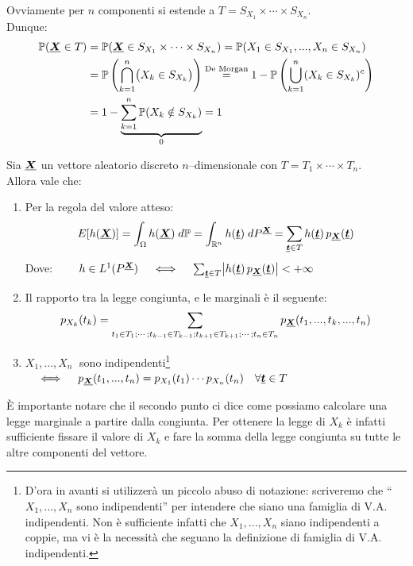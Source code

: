 \begin{teorema}
\begin{dimostrazione}
    Ovviamente per $n$ componenti si estende a $T=S_{X_1}\times \cdots \times S_{X_n}$.\\
    Dunque: 
    \begin{align*}
        \mathbb{P}(\underline{{\boldsymbol{X}}}\in T) & = \mathbb{P}(\underline{{\boldsymbol{X}}} \in S_{X_1}\times \cdots \times S_{X_n}) = \mathbb{P}(X_1\in S_{X_1}, ..., X_n\in S_{X_n}) \\
        & = \mathbb{P}\left( \bigcap_{k=1}^n \bigl(X_k \in S_{X_k}\bigr)\right) \overset{\text{De Morgan}}{ = }1- \mathbb{P}\left(\bigcup_{k=1}^n (X_k\in S_{X_k})^c\right)\\
        & = 1- \underbrace{\sum_{k=1}^n\mathbb{P}(X_k\notin S_{X_k})}_{0} = 1
    \end{align*}
    \end{dimostrazione}
\end{teorema}

\begin{proposizione}
    Sia $\underline{{\boldsymbol{X}}}$ un vettore aleatorio discreto $n$--dimensionale con $T = T_1\times\cdots\times T_n$.\\
    Allora vale che:
    \begin{enumerate}
        \item Per la regola del valore atteso:
        \[E[h(\underline{{\boldsymbol{X}}})] = \int_\Omega h(\underline{{\boldsymbol{X}}})\;d\mathbb{P} = \int_{\mathbb{R}^n}h(\underline{{\boldsymbol{t}}})\;dP^{\underline{{\boldsymbol{X}}}} = \sum_{\underline{{\boldsymbol{t}}}\in T} h(\underline{{\boldsymbol{t}}})\,p_{\underline{{\boldsymbol{X}}}}(\underline{{\boldsymbol{t}}})\]
        Dove: \(\qquad h\in L^1(P^{\underline{{\boldsymbol{X}}}})\quad \iff \quad\sum_{\underline{{\boldsymbol{t}}}\in T} \bigl|h(\underline{{\boldsymbol{t}}})\,p_{\underline{{\boldsymbol{X}}}}(\underline{{\boldsymbol{t}}})\bigr| <+\infty \)
        \item Il rapporto tra la legge congiunta, e le marginali è il seguente:
        \[p_{X_k}(t_k) = \sum_{t_1\in T_1; \cdots; t_{k-1}\in T_{k-1};t_{k+1}\in T_{k+1};\cdots; t_n\in T_n}p_{\underline{{\boldsymbol{X}}}}(t_1, ..., t_k, ..., t_n)\]
        \item $X_1, ..., X_n\;$ sono indipendenti\footnote{D'ora in avanti si utilizzerà un piccolo abuso di notazione: scriveremo che ``$X_1, ..., X_n$ sono indipendenti'' per intendere che siano una famiglia di V.A. indipendenti. Non è sufficiente infatti che $X_1, ..., X_n$ siano indipendenti a coppie, ma vi è la necessità che seguano la definizione di famiglia di V.A. indipendenti.} $\quad \iff \quad p_{\underline{{\boldsymbol{X}}}} (t_1, ..., t_n) = p_{X_1}(t_1)\cdots p_{X_n}(t_n)\quad \forall \underline{{\boldsymbol{t}}}\in T$
    \end{enumerate}
\end{proposizione}

È importante notare che il secondo punto ci dice come possiamo calcolare una legge marginale a partire dalla congiunta. Per ottenere la legge di $X_k$ è infatti sufficiente fissare il valore di $X_k$ e fare la somma della legge congiunta su tutte le altre componenti del vettore.

